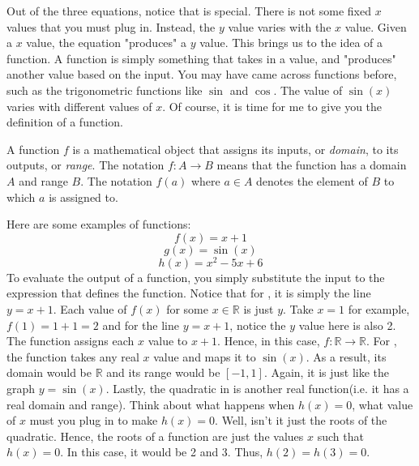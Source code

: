   Out of the three equations, notice that  is special. There is not some fixed \(x\) values that you must plug in. Instead, the \(y\) value varies with the \(x\) value. Given a \(x\) value, the equation "produces" a \(y\) value. This brings us to the idea of a function. A function is simply something that takes in a value, and "produces" another value based on the input. You may have came across functions before, such as the trigonometric functions like \(\sin\) and \(\cos\). The value of \(\sin(x)\) varies with different values of \(x\). Of course, it is time for me to give you the definition of a function. 
  \begin{definition}
    A function \(f\) is a mathematical object that assigns its inputs, or \textit{domain}, to its outputs, or \textit{range}. The notation \(f:A \to B\) means that the function has a domain \(A\) and range \(B\). The notation \(f(a)\) where \(a \in A\) denotes the element of \(B\) to which \(a\) is assigned to.    
  \end{definition}
  \begin{example}
    Here are some examples of functions:
    \begin{equation}
      f(x)=x+1 \label{x+1}
    \end{equation}
    \begin{equation}
      \label{sin}
      g(x)=\sin(x)
    \end{equation}
    \begin{equation}
      \label{quadratic}
      h(x)=x^2-5x+6
    \end{equation}
    \quad \quad To evaluate the output of a function, you simply substitute the input to the expression that defines the function. Notice that for , it is simply the line \(y=x+1\). Each value of \(f(x)\) for some \(x \in \mathbb{R}\) is just \(y\). Take \(x=1\) for example, \(f(1)=1+1=2\) and for the line \(y=x+1\), notice the \(y\) value here is also 2. The function assigns each \(x\) value to \(x+1\). Hence, in this case, \(f:\mathbb{R} \to \mathbb{R}\). For  , the function takes any real \(x\) value and maps it to \(\sin(x)\). As a result, its domain would be \(\mathbb{R}\) and its range would be \([-1,1]\). Again, it is just like the graph \(y=\sin(x)\). \newpage 
   \quad \quad Lastly, the quadratic in  is another real function(i.e. it has a real domain and range). Think about what happens when \(h(x)=0\), what value of \(x\) must you plug in to make \(h(x)=0\). Well, isn't it just the roots of the quadratic. Hence, the roots of a function are just the values \(x\) such that \(h(x)=0\). In this case, it would be 2 and 3. Thus, \(h(2)=h(3)=0\).
  \end{example}
